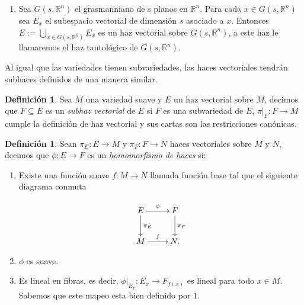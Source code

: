 \documentclass{report}
\theoremstyle{definition}
\newtheorem{defi}[theorem]{Definici\'on}
\let\hom\homo
\DeclareMathOperator{\hom}{Hom}
\begin{document}
\begin{enumerate}
\begin{enumerate}[a.]
    
\end{enumerate}

El caso de funtor contravariante se hace de manera an\'aloga. $\blacksquare$

Como ejemplo tenemos al funtor $\hom ( \text{\_} , \mathbb{R} )$, que a cada espacio vectorial le asigna su espacio dual. Si $M$ es una variedad suave y $E$ es su haz tangente, a $\hom (E, \mathbb{R})$ le llamaremos haz cotangente, a una secci\'on de este haz le llamaremos 1-forma.

Tambi\'en si nos tomamos un espacio vectorial $\mathbb{R}^k$ nos induce un funtor suave dado por $\text{\_} \bigoplus \mathbb{R}^k$ que a cada espacio vectorial $V$ le asigna el espacio vectorial $V \bigoplus \mathbb{R}^k$.


\item Sea $G(s, \mathbb{R}^n)$ el grasmanniano de s planos en $\mathbb{R}^n$. Para cada $x \in G( s , \mathbb{R}^n )$ sea $E_x$ el subespacio vectorial de dimensi\'on $s$ asociado a $x$. Entonces $E := \bigcup\limits_{x \in G(s , \mathbb{R}^n )} E_x$ es un haz vectorial sobre $G(s, \mathbb{R}^n)$, a este haz le llamaremos el haz tautol\'ogico de $G(s, \mathbb{R}^n)$. 
\end{enumerate}

Al igual que las variedades tienen subvariedades, las haces vectoriales tendr\'an subhaces definidos de una manera similar.

 \begin{defi}
  Sea $M$ una variedad suave y $E$ un haz vectorial sobre $M$, decimos que $F \subseteq E$ es un \textit{subhaz vectorial} de $E$ si $F$ es una subvariedad de $E$, $\pi \vert_F: F \to M$ cumple la definici\'on de haz vectorial y sus cartas son las restricciones can\'onicas.
\end{defi}

\begin{defi}
 Sean $\pi_E:E \to M$ y $\pi_F: F \to N$ haces vectoriales sobre $M$ y $N$, decimos que $\phi: E \to F$ es un \textit{homomorfismo de haces} si: 
\end{defi}

\begin{enumerate}
\item Existe una funci\'on suave $f:M \to N$ llamada funci\'on base tal que el siguiente diagrama conmuta   

$$\xymatrix{
E \ar[d]^{\pi_E} \ar[r]^\phi &F\ar[d]^{\pi_F}\\
M \ar[r]^f &N.} $$ 

\item $\phi$ es suave.

\item Es lineal en fibras, es decir, $\phi \vert_{E_x}: E_x \to F_{f(x)}$ es lineal para todo $x \in M$. Sabemos que este mapeo esta bien definido por $1$.
\end{enumerate}
\end{document}
